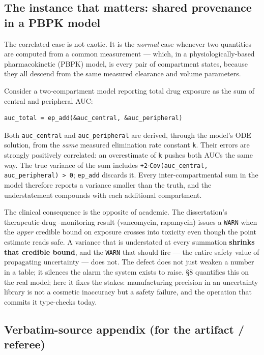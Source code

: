 \documentclass[sigplan,review,anonymous,10pt]{acmart}
\begin{document}
\subsection{The instance that matters: shared provenance in a PBPK model}

The correlated case is not exotic. It is the \emph{normal} case whenever two quantities are computed from a common measurement --- which, in a physiologically-based pharmacokinetic (PBPK) model, is every pair of compartment states, because they all descend from the same measured clearance and volume parameters.

Consider a two-compartment model reporting total drug exposure as the sum of central and peripheral AUC:

\begin{lstlisting}
auc_total = ep_add(&auc_central, &auc_peripheral)
\end{lstlisting}

Both \texttt{auc\_central} and \texttt{auc\_peripheral} are derived, through the model's ODE solution, from the \emph{same} measured elimination rate constant \texttt{k}. Their errors are strongly positively correlated: an overestimate of \texttt{k} pushes both AUCs the same way. The true variance of the sum includes \texttt{+2$\cdot$Cov(auc\_central, auc\_peripheral) > 0}; \texttt{ep\_add} discards it. Every inter-compartmental sum in the model therefore reports a variance smaller than the truth, and the understatement compounds with each additional compartment.

The clinical consequence is the opposite of academic. The dissertation's therapeutic-drug -monitoring result (vancomycin, rapamycin) issues a \texttt{WARN} when the \emph{upper} credible bound on exposure crosses into toxicity even though the point estimate reads safe. A variance that is understated at every summation \textbf{shrinks that credible bound}, and the \texttt{WARN} that should fire --- the entire safety value of propagating uncertainty --- does not. The defect does not just weaken a number in a table; it silences the alarm the system exists to raise. §8 quantifies this on the real model; here it fixes the stakes: manufacturing precision in an uncertainty library is not a cosmetic inaccuracy but a safety failure, and the operation that commits it type-checks today.

\subsection{Verbatim-source appendix (for the artifact / referee)}
\end{document}
